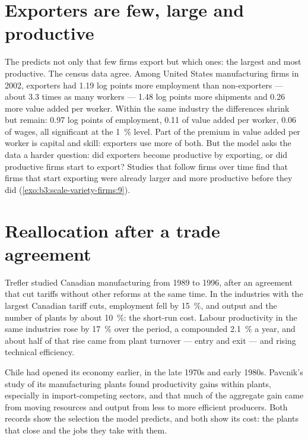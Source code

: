 \section{Exporters are few, large and productive}\label{sec:b3:scale-variety-firms:exporters}

The  predicts not only that few firms export but which
ones: the largest and most productive. The census data agree. Among United
States manufacturing firms in 2002, exporters had 1.19 log points more employment
than non-exporters --- about 3.3 times as many workers --- 1.48 log points more
shipments and 0.26 more value added per worker. Within the same industry the
differences shrink but remain: 0.97 log points of employment, 0.11 of value added
per worker, 0.06 of wages, all significant at the 1~\% level.
Part of the premium in value added per worker is capital and skill: exporters
use more of both. But the model asks the data a harder question: did exporters
become productive by exporting, or did productive firms start to export? Studies
that follow firms over time find that firms that start exporting were already
larger and more productive before they did (\cref{exo:b3:scale-variety-firms:9}).

\section{Reallocation after a trade agreement}\label{sec:b3:scale-variety-firms:reallocation}

\begin{record}
Trefler studied Canadian manufacturing from 1989 to 1996, after an agreement that
cut tariffs without other reforms at the same time. In the industries with the
largest Canadian tariff cuts, employment fell by 15~\%, and output and the number
of plants by about 10~\%: the short-run cost. Labour productivity in the same
industries rose by 17~\% over the period, a compounded 2.1~\% a year, and about half of that rise came from
plant turnover --- entry and exit --- and rising technical efficiency.
\end{record}

Chile had opened its economy earlier, in the late 1970s and early 1980s.
Pavcnik's study of its manufacturing plants found productivity gains within
plants, especially in import-competing sectors, and that much of the aggregate
gain came from moving resources and output from less to more efficient
producers. %
Both records show the selection the model predicts, and both show its cost: the
plants that close and the jobs they take with them.

